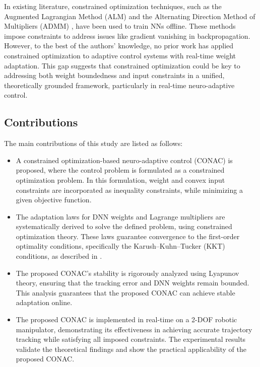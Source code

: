 \documentclass[journal]{IEEEtran}
\begin{document}
In existing literature, constrained optimization techniques, such as the Augmented Lagrangian Method (ALM) \cite{Evens:2021aa} and the Alternating Direction Method of Multipliers (ADMM) \cite{Wang:2019aa,Taylor:2016aa}, have been used to train NNs offline. 
These methods impose constraints to address issues like gradient vanishing in backpropagation. 
However, to the best of the authors' knowledge, no prior work has applied constrained optimization to adaptive control systems with real-time weight adaptation. 
This gap suggests that constrained optimization could be key to addressing both weight boundedness and input constraints in a unified, theoretically grounded framework, particularly in real-time neuro-adaptive control.

\subsection{Contributions}

The main contributions of this study are listed as follows:
\begin{itemize}
    \item A constrained optimization-based neuro-adaptive control (CONAC) is proposed, where the control problem is formulated as a constrained optimization problem. In this formulation, weight and convex input constraints are incorporated as inequality constraints, while minimizing a given objective function.
    \item The adaptation laws for DNN weights and Lagrange multipliers are systematically derived to solve the defined problem, using constrained optimization theory. These laws guarantee convergence to the first-order optimality conditions, specifically the Karush–Kuhn–Tucker (KKT) conditions, as described in \cite[Chap. 12 Thm. 12.1]{Nocedal:2006aa}.
    \item The proposed CONAC's stability is rigorously analyzed using Lyapunov theory, ensuring that the tracking error and DNN weights remain bounded. This analysis guarantees that the proposed CONAC can achieve stable adaptation online.
    \item The proposed CONAC is implemented in real-time on a 2-DOF robotic manipulator, demonstrating its effectiveness in achieving accurate trajectory tracking while satisfying all imposed constraints. The experimental results validate the theoretical findings and show the practical applicability of the proposed CONAC.
\end{itemize}
\end{document}
